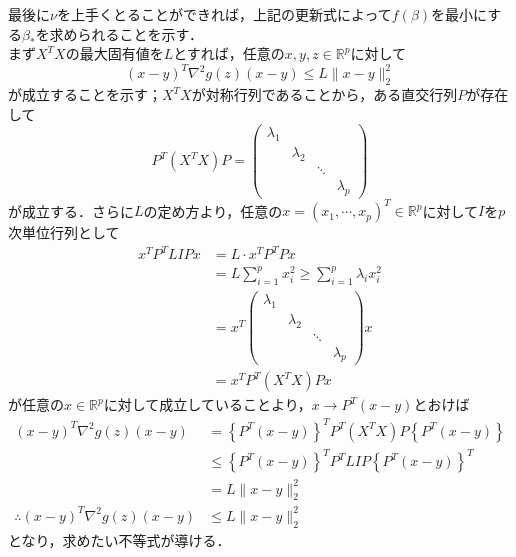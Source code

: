 \documentclass{jsarticle}
\theoremstyle{definition}
\theoremstyle{mystyle} %
\begin{document}
最後に$\nu$を上手くとることができれば，上記の更新式によって$f(\beta)$を最小にする$\beta_{\ast}$を求められることを示す．	\\
まず$X^TX$の最大固有値を$L$とすれば，任意の$x,y,z\in \mathbb{R}^p$に対して
$$(x-y)^T\nabla^2g(z)(x-y)\leq L\|x-y\|_2^2$$
が成立することを示す；$X^TX$が対称行列であることから，ある直交行列$P$が存在して
$$P^T(X^TX)P = \begin{pmatrix}
\lambda_1 & &&\\
 & \lambda_2&&\\
 &  & \ddots &\\
 &  & & \lambda_p
\end{pmatrix}$$
が成立する．さらに$L$の定め方より，任意の$x=(x_1,\cdots ,x_p)^T\in \mathbb{R}^p$に対して$I$を$p$次単位行列として
\begin{align*}
x^TP^TLIPx&=L\cdot x^TP^TPx\\
&=L\sum_{i=1}^px_i^2\geq \sum_{i=1}^p \lambda_i x_i^2\\
&=x^T\begin{pmatrix}
\lambda_1 & &&\\
 & \lambda_2&&\\
 &  & \ddots &\\
 &  & & \lambda_p
\end{pmatrix}x\\
&=x^TP^T(X^TX)Px
\end{align*}
が任意の$x \in \mathbb{R}^p$に対して成立していることより，$x\rightarrow P^T(x-y)$とおけば
\begin{align*}
(x-y)^T\nabla^2 g(z)(x-y)&=\left\{P^T(x-y)\right\}^TP^T(X^TX)P\left\{P^T(x-y)\right\}\\
&\leq \left\{P^T(x-y)\right\}^TP^TLIP\left\{P^T(x-y)\right\}^T\\
&=L\|x-y\|_2^2\\
\therefore (x-y)^T\nabla^2 g(z)(x-y)&\leq L\|x-y\|_2^2
\end{align*}
となり，求めたい不等式が導ける．\\
\end{document}
